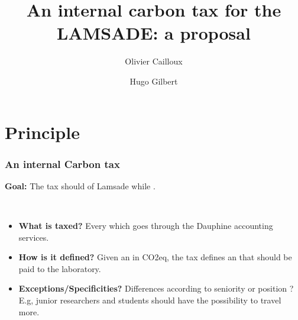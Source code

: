 \documentclass[french, english]{beamer}
\title[Proposal for a tax]{An internal carbon tax for the LAMSADE: a proposal}
\author{Olivier Cailloux \and Hugo Gilbert}
\institute[LAMSADE]{LAMSADE, Université Paris-Dauphine, PSL}
\date{\formatdate{11}{10}{2022}}
\begin{document}
\begin{frame}[plain]
	\titlepage
\end{frame}
\addtocounter{framenumber}{-1}

\section{Principle}





\frame
{
  \frametitle{An internal Carbon tax}

\textbf{Goal:} The tax should  of Lamsade while . 

\

  \begin{itemize}
  \item \textbf{What is taxed?} Every  which goes through the Dauphine accounting services.
  \item \textbf{How is it defined?} Given an  in CO2eq, the tax defines an  that should be paid to the laboratory.
  \item \textbf{Exceptions/Specificities?} Differences according to seniority or position ? E.g, junior researchers and students should have the possibility to travel more.
  \end{itemize}
}
\end{document}
